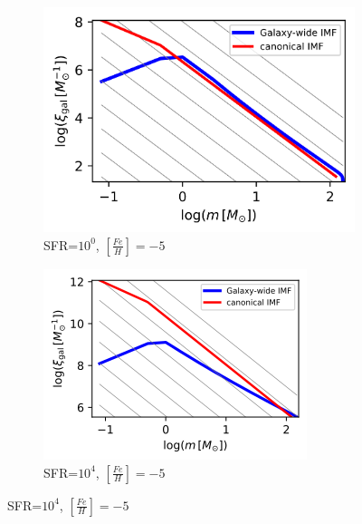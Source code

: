 \begin{figure}
	\centering
	\begin{subfigure}[b]{0.4\textwidth}
		\includegraphics[width=\textwidth]{sfr1-feh-5.png}
		\caption{SFR=$10^{0}$, $[\frac{Fe}{H}]=-5$}
		\label{fig:s1e4-1}
	\end{subfigure}
	\begin{subfigure}[b]{0.4\textwidth}
		\includegraphics[width=\textwidth]{sfr1e4-feh-5.png}
		\caption{SFR=$10^{4}$, $[\frac{Fe}{H}]=-5$}
		\label{fig:2d-5dt}
	\end{subfigure}
	

\end{figure}
